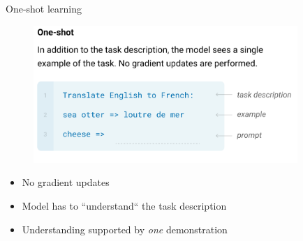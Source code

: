 
\begin{vbframe}{One-shot learning}

\vfill

	\begin{figure}
		\centering
		\includegraphics[width=10cm]{figure/gptoneshot.png}\\
	\end{figure}

\begin{itemize}
	\item No gradient updates
	\item Model has to ``understand`` the task description
	\item Understanding supported by \textit{one} demonstration
\end{itemize}

\vfill

\end{vbframe}


